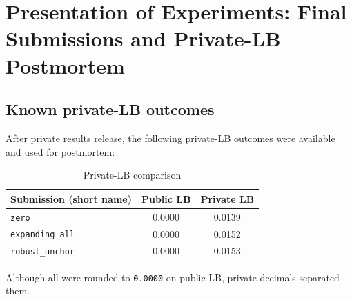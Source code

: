 \section{Presentation of Experiments: Final Submissions and Private-LB Postmortem}

\subsection{Known private-LB outcomes}
After private results release, the following private-LB outcomes were available and used for postmortem:
\begin{table}[h]
\centering
\caption{Private-LB comparison}
\begin{tabular}{lcc}
\toprule
Submission (short name) & Public LB & Private LB \\
\midrule
\texttt{zero} & 0.0000 & 0.0139 \\
\texttt{expanding\_all} & 0.0000 & 0.0152 \\
\texttt{robust\_anchor} & 0.0000 & 0.0153 \\
\bottomrule
\end{tabular}
\end{table}

Although all were rounded to \texttt{0.0000} on public LB, private decimals separated them.

